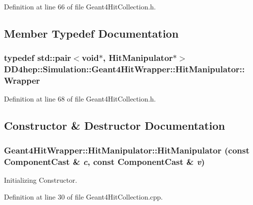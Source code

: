 Definition at line 66 of file Geant4HitCollection.h.

\subsection{Member Typedef Documentation}
\hypertarget{class_d_d4hep_1_1_simulation_1_1_geant4_hit_wrapper_1_1_hit_manipulator_a4bb62cc7e4979a8d0aea281477a4e38e}{
\subsubsection[{Wrapper}]{\setlength{\rightskip}{0pt plus 5cm}typedef std::pair$<$void$\ast$, {\bf HitManipulator}$\ast$$>$ {\bf DD4hep::Simulation::Geant4HitWrapper::HitManipulator::Wrapper}}}
\label{class_d_d4hep_1_1_simulation_1_1_geant4_hit_wrapper_1_1_hit_manipulator_a4bb62cc7e4979a8d0aea281477a4e38e}


Definition at line 68 of file Geant4HitCollection.h.

\subsection{Constructor \& Destructor Documentation}
\hypertarget{class_d_d4hep_1_1_simulation_1_1_geant4_hit_wrapper_1_1_hit_manipulator_ab04f459fb64ae024b2dcf7f7fb0d7775}{
\subsubsection[{HitManipulator}]{\setlength{\rightskip}{0pt plus 5cm}Geant4HitWrapper::HitManipulator::HitManipulator (const {\bf ComponentCast} \& {\em c}, \/  const {\bf ComponentCast} \& {\em v})}}
\label{class_d_d4hep_1_1_simulation_1_1_geant4_hit_wrapper_1_1_hit_manipulator_ab04f459fb64ae024b2dcf7f7fb0d7775}


Initializing Constructor. 

Definition at line 30 of file Geant4HitCollection.cpp.

